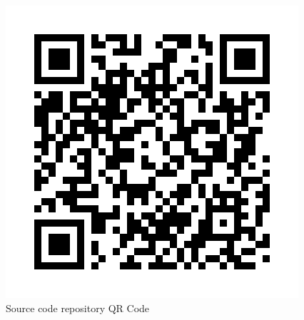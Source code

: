 \begin{figure}[!t]
  \centering
  \caption[Source code repository, QR Code]{Source code repository QR Code}
  \label{fig:qr_code_repository}
  \includegraphics[width=0.8\linewidth]{img/qr_code_repository.png}
\end{figure}
